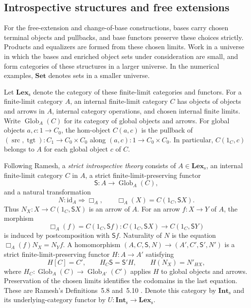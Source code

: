 \documentclass[11pt]{article}
\theoremstyle{definition}
\theoremstyle{remark}
\begin{document}
\subsection{Introspective structures and free extensions}
\label{sec:introspective-extension}

For the free-extension and change-of-base constructions, bases carry
chosen terminal objects and pullbacks, and base functors preserve
these choices strictly. Products and
equalizers are formed from these chosen limits. Work in a universe
in which the bases and enriched object sets under consideration
are small, and form categories of these structures in a larger
universe. In the numerical examples, $\mathbf{Set}$ denotes sets
in a smaller universe.

Let $\mathbf{Lex}_{\mathrm{s}}$ denote the category of these
finite-limit categories and functors. For a finite-limit category
$A$, an internal finite-limit category $C$ has objects of objects
and arrows in $A$, internal category operations, and chosen internal
finite limits. Write $\operatorname{Glob}_A(C)$ for its category of
global objects and arrows. For global objects $a,c:1\to C_0$,
the hom-object $C(a,c)$ is the pullback of
$(\operatorname{src},\operatorname{tgt}):C_1\to C_0\times C_0$
along $(a,c):1\to C_0\times C_0$.
In particular, $C(1_C,c)$ belongs to $A$ for each global
object $c$ of $C$.

Following Ramesh, a \emph{strict introspective theory} consists of
$A\in\mathbf{Lex}_{\mathrm{s}}$, an internal finite-limit category
$C$ in $A$, a strict finite-limit-preserving functor
\[
 \mathsf S:A\longrightarrow\operatorname{Glob}_A(C),
\]
and a natural transformation
\[
 N:\mathrm{id}_A\Longrightarrow\Box_A,
 \qquad \Box_A(X)=C(1_C,\mathsf SX).
\]
Thus $N_X:X\to C(1_C,\mathsf SX)$ is an arrow of $A$.
For an arrow $f:X\to Y$ of $A$, the morphism
\[
 \Box_A(f)=C(1_C,\mathsf Sf):
 C(1_C,\mathsf SX)\longrightarrow C(1_C,\mathsf SY)
\]
is induced by postcomposition with $\mathsf Sf$.
Naturality of $N$ is the equation $\Box_A(f)N_X=N_Yf$.
A homomorphism $(A,C,\mathsf S,N)\to(A',C',\mathsf S',N')$ is a strict
finite-limit-preserving functor $H:A\to A'$ satisfying
\[
 H[C]=C',\qquad
 H_C \mathsf S=\mathsf S'H,\qquad H(N_X)=N'_{HX},
\]
where $H_C:\operatorname{Glob}_A(C)\to
\operatorname{Glob}_{A'}(C')$ applies $H$ to global objects and
arrows. Preservation of the chosen limits identifies the codomains
in the last equation. These are Ramesh's Definitions~5.8 and~5.10
\cite[pp.~93--94]{Ramesh}. Denote this category by
$\mathbf{Int}_{\mathrm{s}}$ and its underlying-category functor by
$U:\mathbf{Int}_{\mathrm{s}}\to\mathbf{Lex}_{\mathrm{s}}$.
\end{document}
